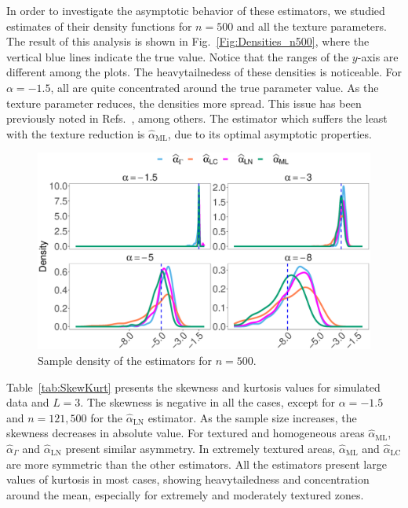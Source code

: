 \documentclass[twocolumn]{svjour3}
\begin{document}
In order to investigate the asymptotic behavior of these estimators, we studied estimates of their density functions for $n=500$ and all the texture parameters. 
The result of this analysis is shown in Fig.~\ref{Fig:Densities_n500}, where
the vertical blue lines indicate the true value. 
Notice that the ranges of the $y$-axis are different among the plots. 
The heavytailnedess of these densities is noticeable.
For $\alpha=-1.5$, all are quite concentrated around the true parameter value. 
As the texture parameter reduces, the densities more spread.
This issue has been previously noted in Refs.~\cite{APSAR2013ParameterEstimationStochasticDistances,CribariFrerySilva:CSDA,AllendeFreryetal:JSCS:05,FreryCribariSouza:JASP:04}, among others.
The estimator which suffers the least with the texture reduction is $\widehat{\alpha}_{\text{{ML}}}$, due to its optimal asymptotic properties.      

\begin{figure}[hbt]
	\centering
	\includegraphics[width=1\linewidth]{../../../Figures/PaperTesis/Asymptotic_n500_TodoAlfa}
	\caption{\label{Fig:Densities_n500} Sample density of the estimators for $n=500$. }\label{Fig:DistEstimator}
\end{figure}

Table~\ref{tab:SkewKurt} presents the skewness and kurtosis values for simulated data and $L=3$. 
The skewness is negative in all the cases, except for $\alpha=-1.5$ and $n=121,500$ for the $\widehat{\alpha}_{\text{{LN}}}$ estimator. 
As the sample size increases, the skewness decreases in absolute value. 
For textured and homogeneous areas $\widehat{\alpha}_{\text{{ML}}}$, $\widehat{\alpha}_{\Gamma}$ and $\widehat{\alpha}_{\text{{LN}}}$ present similar asymmetry. 
In extremely textured areas, $\widehat{\alpha}_{\text{{ML}}}$ and $\widehat{\alpha}_{\text{{LC}}}$ are more symmetric than the other estimators.
All the estimators present large values of kurtosis in most cases, showing heavytailedness and concentration around the mean, especially for extremely and moderately textured zones.
\end{document}
